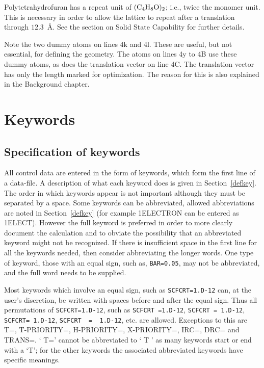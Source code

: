 \documentclass[11pt]{book}
\def\chem{\rm\everymath={\rm}}
\begin{document}
 Polytetrahydrofuran has a repeat unit of $\chem (C_4H_8O)_2$; i.e.,
 twice  the  monomer  unit.   This is necessary in order to allow the
 lattice to repeat after a translation through $12.3$~\AA.   See
 the section on Solid State Capability for further details.

      Note the two dummy atoms on lines 4k and 4l.  These are useful,
 but not essential, for defining the geometry.  The atoms on lines 4y
 to 4B use these dummy atoms, as does the translation vector on  line
 4C.    The  translation  vector  has  only  the  length  marked  for
 optimization.   The  reason  for  this  is  also  explained  in  the
 Background chapter.
\chapter{Keywords}
\section{Specification of keywords}
All control data are entered in the form of keywords, which form the
 first  line  of  a data-file.  A description of what each keyword does is
 given in Section~\ref{defkey}. The order in which keywords  appear is not
 important  although they must be separated by a space.  Some keywords can
 be abbreviated, allowed abbreviations are noted in Section~\ref{defkey} 
 (for
 example 1ELECTRON can be entered as 1ELECT).  However the full keyword is
 preferred in order to  more  clearly  document  the  calculation  and  to
 obviate  the  possibility  that  an  abbreviated  keyword  might  not  be
 recognized.  If there is insufficient space in the first line for all the
 keywords  needed,  then consider abbreviating the longer words.  One type
 of keyword, those with an equal sign, such as, \verb/BAR=0.05/,  may  not  be
 abbreviated, and the full word needs to be supplied.

 Most keywords which involve an equal sign, such as \verb/SCFCRT=1.D-12/
 can,  at  the  user's discretion, be written with spaces before and after
 the  equal  sign.   Thus  all  permutations  of  \verb/SCFCRT=1.D-12/,  
 such  as \verb/SCFCRT =1.D-12/, \verb/SCFCRT = 1.D-12/, 
 \verb/SCFCRT= 1.D-12/, \verb/SCFCRT  =  1.D-12/, etc.
 are allowed.   Exceptions  to  this  are  T=,  T-PRIORITY=,  H-PRIORITY=,
 X-PRIORITY=, IRC=, DRC= and TRANS=.  ` T=' cannot be abbreviated to ` T '
 as many keywords start or end with a `T';  for  the  other  keywords  the
 associated abbreviated keywords have specific meanings.
\end{document}
